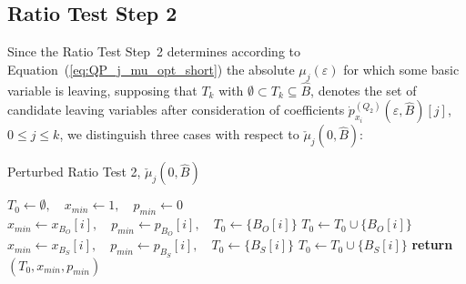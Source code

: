 \documentclass[a4paper]{article}
\newcommand{\pxz}[3]{\ensuremath{\dot{p}_{x_{#1}}^{(#2)}(\varepsilon, #3)}}
\begin{document}
\subsection{Ratio Test Step 2}
Since the Ratio Test Step~2 determines according to
Equation~(\ref{eq:QP_j_mu_opt_short}) the absolute
$\mu_{j}(\varepsilon)$ for which some
basic variable is leaving, supposing that $T_{k}$ with 
$\emptyset  \subset T_{k} \subseteq \hat{B}$, denotes the set 
of candidate leaving variables after consideration of coefficients
$\pxz{i}{Q_{2}}{\hat{B}}[j]$, 
$0 \leq j \leq k$,
we distinguish three cases with respect to
$\check{\mu}_{j}(0, \hat{B})$:
\begin{algorithm}
\caption{Perturbed Ratio Test 2, $\check{\mu}_{j}(0,\hat{B})$}
\label{alg:ratio_test_step_2_0}
\begin{algorithmic}
\State $T_{0} \gets \emptyset,
  \quad x_{min} \gets 1, \quad  p_{min} \gets 0$
            \State $x_{min} \gets x_{B_{O}}[i],
	      \quad p_{min} \gets p_{B_{O}}[i],
	      \quad T_{0} \gets \{B_{O}[i]\}$
            \State $T_{0} \gets T_{0} \cup \{B_{O}[i]\}$	 
        \EndIf
    \EndIf 
\EndFor
{}
            \State $x_{min} \gets x_{B_{S}}[i],
	      \quad p_{min} \gets p_{B_{S}}[i],
	      \quad T_{0} \gets \{B_{S}[i]\}$
            \State $T_{0} \gets T_{0} \cup \{B_{S}[i]\}$
	\EndIf	
    \EndIf 
\EndFor
\State \textbf{return} $(T_{0}, x_{min}, p_{min})$
\EndFunction
\end{algorithmic}
\end{algorithm}
\end{document}
